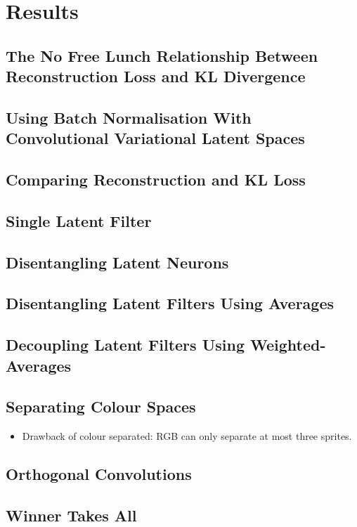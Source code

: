 \chapter{Results}

\label{ch:Results}

%
%
%
%
%
\section{The No Free Lunch Relationship Between Reconstruction Loss and KL Divergence}
\lipsum[2]


%
%
%
%
%
\section{Using Batch Normalisation With Convolutional Variational Latent Spaces}
\lipsum[2]


%
%
%
%
%
\section{Comparing Reconstruction and KL Loss}
\lipsum[2]


%
%
%
%
%
\section{Single Latent Filter}
\lipsum[2]


%
%
%
%
%
\section{Disentangling Latent Neurons}
\lipsum[2]


%
%
%
%
%
\section{Disentangling Latent Filters Using Averages}
\lipsum[2]


%
%
%
%
%
\section{Decoupling Latent Filters Using Weighted-Averages}
\lipsum[2]


%
%
%
%
%
\section{Separating Colour Spaces}
\lipsum[2]

\begin{itemize}
\item Drawback of colour separated: RGB can only separate at most three sprites.
\end{itemize}

%
%
%
%
%
\section{Orthogonal Convolutions}
\lipsum[2]


%
%
%
%
%
\section{Winner Takes All}
\lipsum[2]
